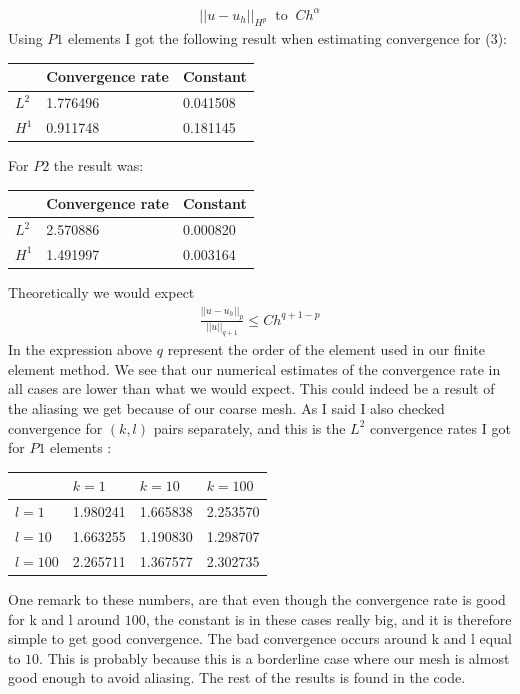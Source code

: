 \documentclass[11pt,a4paper]{report}
\begin{document}
\begin{align}
||u-u_h||_{H^p} \ \text{ to } \ Ch^{\alpha} 
\end{align}
Using $P1$ elements I got the following result when estimating convergence for (3):
\begin{center}
    \begin{tabular}{| l | l | l |}
    \hline
     & Convergence rate & Constant  \\ \hline
    $L^2$ &  1.776496& 0.041508 \\ \hline
    $H^1$ &  0.911748 & 0.181145 	\\ \hline
    \end{tabular}
\end{center}
For $P2$ the result was:
\begin{center}
    \begin{tabular}{| l | l | l |}
    \hline
     & Convergence rate & Constant  \\ \hline
    $L^2$ & 2.570886 & 0.000820 \\ \hline
    $H^1$ & 1.491997 &  0.003164	\\ \hline
    \end{tabular}
\end{center}
Theoretically we would expect 
\begin{align*}
\frac{||u-u_h||_p}{||u||_{q+1}}  \leq Ch^{q+1-p}
\end{align*}
In the expression above $q$ represent the order of the element used in our finite element method. We see that our numerical estimates of the convergence rate in all cases are lower than what we would expect. This could indeed be a result of the aliasing we get because of our coarse mesh. As I said I also checked convergence for $(k,l)$ pairs separately, and this is the $L^2$ convergence rates I got for $P1$ elements :
\begin{center}
    \begin{tabular}{| l | l | l | l |}
    \hline
     & $k=1$ & $k=10$ & $k=100$  \\ \hline
    $l=1$ & 1.980241 & 1.665838 &2.253570  \\ \hline
    $l=10$ & 1.663255 &  1.190830 &	1.298707\\ \hline
    $l=100$ & 2.265711 &  1.367577 & 2.302735	\\ \hline
    \end{tabular}
\end{center}
One remark to these numbers, are that even though the convergence rate is good for k and l around $100$, the constant is in these cases really big, and it is therefore simple to get good convergence. The bad convergence occurs around k and l equal to $10$. This is probably because this is a borderline case where our mesh is almost good enough to avoid aliasing. The rest of the results is found in the code.
\end{document}
